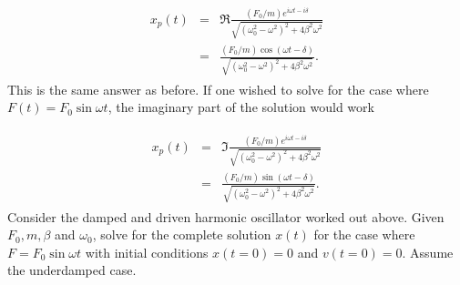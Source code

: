 \documentclass[letterpaper,10pt,english]{sphinxmanual}
\begin{document}
\begin{equation*}
\begin{split}
\begin{eqnarray}
\label{eq:fastdriven1} \tag{20}
x_p(t)&=&\Re\frac{(F_0/m)e^{i\omega t-i\delta}}{\sqrt{(\omega_0^2-\omega^2)^2+4\beta^2\omega^2}}\\
\nonumber
&=&\frac{(F_0/m)\cos(\omega t-\delta)}{\sqrt{(\omega_0^2-\omega^2)^2+4\beta^2\omega^2}}.
\end{eqnarray}
\end{split}
\end{equation*}
This is the same answer as before.
If one wished to solve for the case where \(F(t)= F_0\sin\omega t\), the imaginary part of the solution would work




\begin{equation*}
\begin{split}
\begin{eqnarray}
\label{eq:fastdriven2} \tag{21}
x_p(t)&=&\Im\frac{(F_0/m)e^{i\omega t-i\delta}}{\sqrt{(\omega_0^2-\omega^2)^2+4\beta^2\omega^2}}\\
\nonumber
&=&\frac{(F_0/m)\sin(\omega t-\delta)}{\sqrt{(\omega_0^2-\omega^2)^2+4\beta^2\omega^2}}.
\end{eqnarray}
\end{split}
\end{equation*}
Consider the damped and driven harmonic oscillator worked out above. Given \(F_0, m,\beta\) and \(\omega_0\), solve for the complete solution \(x(t)\) for the case where \(F=F_0\sin\omega t\) with initial conditions \(x(t=0)=0\) and \(v(t=0)=0\). Assume the underdamped case.
\end{document}
